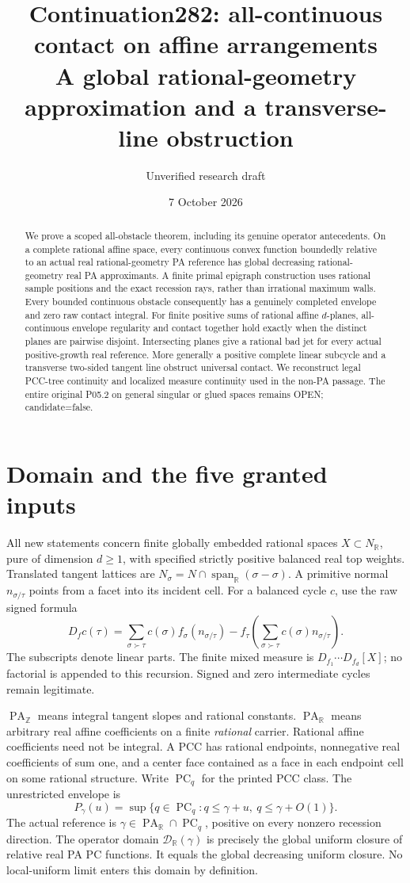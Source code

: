 \documentclass[11pt]{article}
\title{Continuation282: all-continuous contact on affine arrangements\\
\large A global rational-geometry approximation and a transverse-line obstruction}
\author{Unverified research draft}
\date{7 October 2026}
\newcommand{\R}{\mathbb R}
\newcommand{\Z}{\mathbb Z}
\newcommand{\PC}{\operatorname{PC}_q}
\newcommand{\PA}{\operatorname{PA}}
\newcommand{\D}{\mathcal D_\R(\gamma)}
\begin{document}
\maketitle
\begin{abstract}
We prove a scoped all-obstacle theorem, including its genuine operator
antecedents. On a complete rational affine space, every continuous convex
function boundedly relative to an actual real rational-geometry PA reference
has global decreasing rational-geometry real PA approximants. A finite
primal epigraph construction uses rational sample positions and the exact
recession rays, rather than irrational maximum walls. Every bounded
continuous obstacle consequently has a genuinely completed envelope and
zero raw contact integral. For finite positive sums of rational affine
$d$-planes, all-continuous envelope regularity and contact together hold
exactly when the distinct planes are pairwise disjoint. Intersecting planes
give a rational bad jet for every actual positive-growth real reference.
More generally a positive complete linear subcycle and a transverse
two-sided tangent line obstruct universal contact. We reconstruct legal
PCC-tree continuity and localized measure continuity used in the
non-PA passage. The entire original P05.2 on general singular or glued
spaces remains OPEN; candidate=false.
\end{abstract}

\section{Domain and the five granted inputs}
All new statements concern finite globally embedded rational spaces
$X\subset N_\R$, pure of dimension $d\geq1$, with specified strictly
positive balanced real top weights. Translated tangent lattices are
$N_\sigma=N\cap\operatorname{span}_\R(\sigma-\sigma)$. A primitive
normal $n_{\sigma/\tau}$ points from a facet into its incident cell.
For a balanced cycle $c$, use the raw signed formula
\begin{equation}\label{raw}
 D_f c(\tau)=\sum_{\sigma\succ\tau}c(\sigma)f_\sigma(n_{\sigma/\tau})
 -f_\tau\left(\sum_{\sigma\succ\tau}c(\sigma)n_{\sigma/\tau}\right).
\end{equation}
The subscripts denote linear parts. The finite mixed measure is
$D_{f_1}\cdots D_{f_d}[X]$; no factorial is appended to this recursion.
Signed and zero intermediate cycles remain legitimate.

$\PA_\Z$ means integral tangent slopes and rational constants.
$\PA_\R$ means arbitrary real affine coefficients on a finite
\emph{rational} carrier. Rational affine coefficients need not be
integral. A PCC has rational endpoints, nonnegative real coefficients
of sum one, and a center face contained as a face in each endpoint cell
on some rational structure. Write $\PC$ for the printed PCC class.
The unrestricted envelope is
\[
 P_\gamma(u)=\sup\{q\in\PC:q\leq\gamma+u,\ q\leq\gamma+O(1)\}.
\]
The actual reference is $\gamma\in\PA_\R\cap\PC$, positive on every
nonzero recession direction. The operator domain $\D$ is precisely the
global uniform closure of relative real PA PC functions. It equals the
global decreasing uniform closure. No local-uniform limit enters this
domain by definition.
\end{document}
